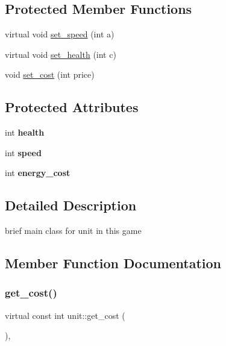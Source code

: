 \subsection*{Protected Member Functions}
\begin{DoxyCompactItemize}
\item 
virtual void \mbox{\hyperlink{classunit_a3b2dbfe9c1daaf2b8ef6b604d7803dc2}{set\+\_\+speed}} (int a)
\item 
virtual void \mbox{\hyperlink{classunit_a1dabc406074919750b1c606496e8e42d}{set\+\_\+health}} (int c)
\item 
void \mbox{\hyperlink{classunit_a1f7b84a24ff09c2653e5c6d2d046472e}{set\+\_\+cost}} (int price)
\end{DoxyCompactItemize}
\subsection*{Protected Attributes}
\begin{DoxyCompactItemize}
\item 
\mbox{\label{classunit_aeefab70a4b68985ea17e1acf9694e765}} 
int {\bfseries health}
\item 
\mbox{\label{classunit_aa5cd467b54f26a2bf446ba27d913d035}} 
int {\bfseries speed}
\item 
\mbox{\label{classunit_a9101170be3651fe1f7169ab7275715b1}} 
int {\bfseries energy\+\_\+cost}
\end{DoxyCompactItemize}


\subsection{Detailed Description}
brief main class for unit in this game 

\subsection{Member Function Documentation}
\mbox{\label{classunit_a817ef860467c21c378deb39f738c33e0}} 
\subsubsection{\texorpdfstring{get\+\_\+cost()}{get\_cost()}}
{\footnotesize\ttfamily virtual const int unit\+::get\+\_\+cost (\begin{DoxyParamCaption}{ }\end{DoxyParamCaption})\hspace{0.3cm}{\ttfamily [inline]}, {\ttfamily [virtual]}}

